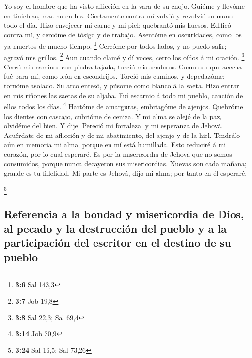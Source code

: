  Yo soy el hombre que ha visto aflicción en la vara de su
enojo.  Guióme y llevóme en tinieblas, mas no en luz.
 Ciertamente contra mí volvió y revolvió su mano todo el
día.  Hizo envejecer mi carne y mi piel; quebrantó mis
huesos.  Edificó contra mí, y cercóme de tósigo y de
trabajo.  Asentóme en oscuridades, como los ya muertos de
mucho tiempo. \footnote{\textbf{3:6} Sal 143,3}  Cercóme por
todos lados, y no puedo salir; agravó mis grillos. \footnote{\textbf{3:7}
  Job 19,8}  Aun cuando clamé y dí voces, cerro los oídos á
mi oración. \footnote{\textbf{3:8} Sal 22,3; Sal 69,4} 
Cercó mis caminos con piedra tajada, torció mis senderos. 
Como oso que acecha fué para mí, como león en escondrijos. 
Torció mis caminos, y depedazóme; tornóme asolado.  Su arco
entesó, y púsome como blanco á la saeta.  Hizo entrar en
mis riñones las saetas de su aljaba.  Fuí escarnio á todo
mi pueblo, canción de ellos todos los días. \footnote{\textbf{3:14} Job
  30,9}  Hartóme de amarguras, embriagóme de ajenjos.
 Quebróme los dientes con cascajo, cubrióme de ceniza.
 Y mi alma se alejó de la paz, olvidéme del bien.
 Y dije: Pereció mi fortaleza, y mi esperanza de Jehová.
 Acuérdate de mi aflicción y de mi abatimiento, del ajenjo
y de la hiel.  Tendrálo aún en memoria mi alma, porque en
mí está humillada.  Esto reduciré á mi corazón, por lo cual
esperaré.  Es por la misericordia de Jehová que no somos
consumidos, porque nunca decayeron sus misericordias. 
Nuevas son cada mañana; grande es tu fidelidad.  Mi parte
es Jehová, dijo mi alma; por tanto en él esperaré.

\footnote{\textbf{3:24} Sal 16,5; Sal 73,26}

\hypertarget{referencia-a-la-bondad-y-misericordia-de-dios-al-pecado-y-la-destrucciuxf3n-del-pueblo-y-a-la-participaciuxf3n-del-escritor-en-el-destino-de-su-pueblo}{%
\subsection{Referencia a la bondad y misericordia de Dios, al pecado y
la destrucción del pueblo y a la participación del escritor en el
destino de su
pueblo}\label{referencia-a-la-bondad-y-misericordia-de-dios-al-pecado-y-la-destrucciuxf3n-del-pueblo-y-a-la-participaciuxf3n-del-escritor-en-el-destino-de-su-pueblo}}


